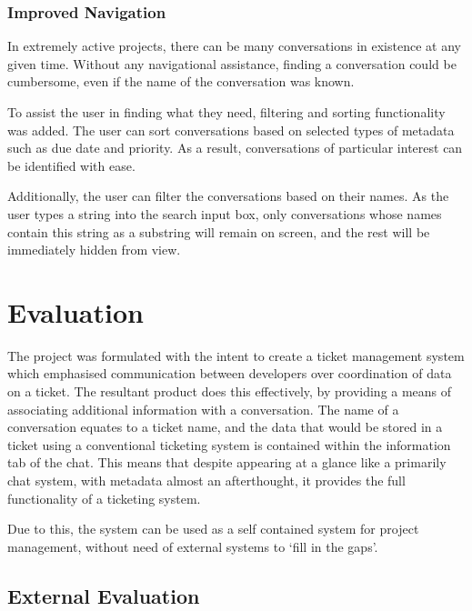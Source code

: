 \documentclass[a4paper]{l3proj}
\begin{document}
\subsection{Improved Navigation}
\label{improved}

In extremely active projects, there can be many conversations in existence at any given time. Without any navigational assistance, finding a conversation could be cumbersome, even if the name of the conversation was known. 

To assist the user in finding what they need, filtering and sorting functionality was added. The user can sort conversations based on selected types of metadata such as due date and priority. As a result, conversations of particular interest can be identified with ease. 

Additionally, the user can filter the conversations based on their names. As the user types a string into the search input box, only conversations whose names contain this string as a substring will remain on screen, and the rest will be immediately hidden from view.

\chapter{Evaluation}
\label{evaluation}

The project was formulated with the intent to create a ticket management system which emphasised communication between developers over coordination of data on a ticket. The resultant product does this effectively, by providing a means of associating additional information with a conversation. The name of a conversation equates to a ticket name, and the data that would be stored in a ticket using a conventional ticketing system is contained within the information tab of the chat.  This means that despite appearing at a glance like a primarily chat system, with metadata almost an afterthought, it provides the full functionality of a ticketing system.  

Due to this, the system can be used as a self contained system for project management, without need of external systems to ‘fill in the gaps’.

\section{External Evaluation}
\label{externalEvaluation}
\end{document}
